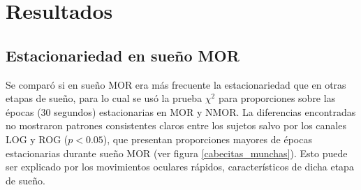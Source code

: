 

\chapter{Resultados}



\section{Estacionariedad en sueño MOR}

Se comparó si en sueño MOR era más frecuente la estacionariedad que en otras etapas de 
sueño, para lo cual se usó la prueba $\chi^{2}$ para proporciones sobre las épocas 
(30 segundos) estacionarias en MOR y NMOR.
%
La diferencias encontradas no mostraron patrones consistentes claros entre los sujetos salvo por 
los canales LOG y ROG ($p<0.05$), que presentan proporciones mayores de épocas estacionarias 
durante sueño MOR (ver figura \ref{cabecitas_munchas}). Esto puede ser explicado por los 
movimientos oculares rápidos, característicos de dicha etapa de sueño.
%

